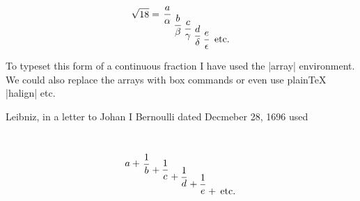 {\begin{gather}
\setlength\arraycolsep{1pt}
\sqrt{18} =  \begin{array}[c]{c}
\dfrac{a}{\alpha}\\ 
\end{array}
\begin{array}[c]{c}
 \\[1em] \dfrac{b}{\beta} \\ 
\end{array}
\begin{array}[c]{c}
 \\[2em] \dfrac{c}{\gamma}\\
\end{array}
\begin{array}[c]{c}
 \\[3em]  \dfrac{d}{\delta}\\
\end{array}
\begin{array}[c]{c}
 \\[4em] \dfrac{e}{\epsilon}\:\:\text{etc.}\\
\end{array}
\end{gather}

To typeset this form of a continuous fraction I have used the |array| environment. We could also replace the arrays with box commands or even use plainTeX |halign| etc.




Leibniz, in a letter to Johan I Bernoulli dated Decmeber 28, 1696 used
\begin{gather}
\setlength\arraycolsep{1pt}
a + \begin{array}[c]{c}
\dfrac{1}{b}
\end{array}
\begin{array}[c]{c}
\underset{\raisebox{-.6em}{+}}{}\\ 
\end{array}
\begin{array}[c]{c}
 \\ \dfrac{1}{c} \\ 
\end{array}
\begin{array}[c]{c}
\underset{\raisebox{-2em}{+}}{}\\ 
\end{array}
\begin{array}[c]{c}
 \\[1.5em] \dfrac{1}{d}\\
\end{array}
\begin{array}[c]{c}
\underset{\raisebox{-3.5em}{+}}{}\\ 
\end{array}
\begin{array}[c]{c}
 \\[3em]  \dfrac{1}{e}\\
\end{array}
\begin{array}[c]{c}
 \\[4.6em]  {+}\:\:\text{etc.}\\
\end{array}
\end{gather}

}
